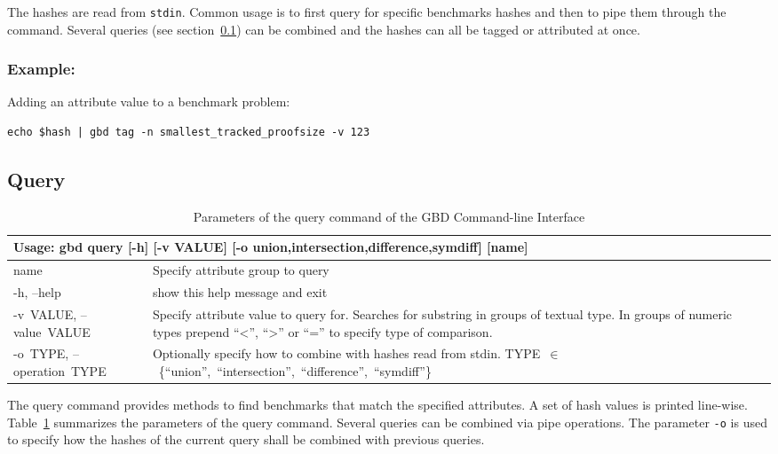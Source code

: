 \documentclass{easychair}
\begin{document}
The hashes are read from \texttt{stdin}. 
Common usage is to first query for specific benchmarks hashes and then to pipe them through the command.
Several queries (see section~\ref{cli:query}) can be combined and the hashes can all be tagged or attributed at once.

\subsubsection{Example:} Adding an attribute value to a benchmark problem:
\begin{verbatim}
echo $hash | gbd tag -n smallest_tracked_proofsize -v 123 
\end{verbatim}


\subsection{Query}
\label{cli:query}

\begin{table}[ht]
\begin{tabular}{p{.21\linewidth}|p{.71\linewidth}}
\multicolumn{2}{l}{\bf Usage: \textsf{gbd query [-h] [-v VALUE]
                    [-o {union,intersection,difference,symdiff}]
                    [name]}}\\

\hline
  \sf name                  &Specify attribute group to query\\

  \sf -h, --help            &show this help message and exit\\
  \sf \mbox{-v VALUE}, \mbox{--value VALUE}
                        &Specify attribute value to query for. Searches for
                        substring in groups of textual type. In groups of
                        numeric types prepend \textsf{``<'', ``>'' or ``=''} to specify type
                        of comparison.\\
  \sf \mbox{-o TYPE}, \mbox{--operation TYPE}
  			            &Optionally specify how to combine with hashes read
                        from \textsf{stdin}. \mbox{\textsf{TYPE $\in$ \{``union'', ``intersection'', ``difference'', ``symdiff''\}}}
\end{tabular}
\caption{Parameters of the query command of the GBD Command-line Interface}
\label{fig:cli:query}
\end{table}

The query command provides methods to find benchmarks that match the specified attributes. 
A set of hash values is printed line-wise. 
Table~\ref{fig:cli:query} summarizes the parameters of the query command.
Several queries can be combined via pipe operations. 
The parameter \texttt{-o} is used to specify how the hashes of the current query shall be
combined with previous queries. 
\end{document}
